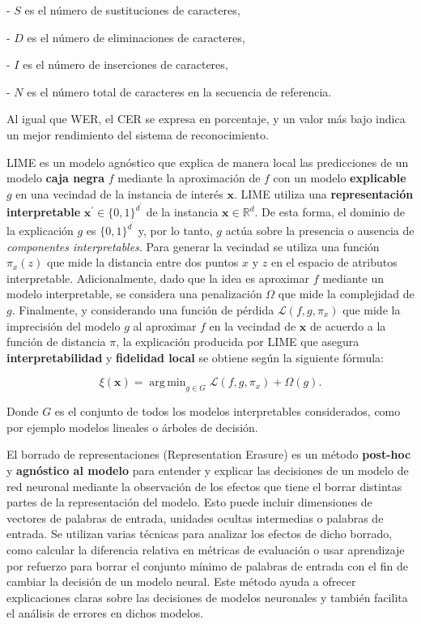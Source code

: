 \documentclass[conference]{IEEEtran}
\DeclareMathOperator*{\argmin}{arg\,min}
\begin{document}
\begin{itemize}
    - \( S \) es el número de sustituciones de caracteres,
    
    - \( D \) es el número de eliminaciones de caracteres,
    
    - \( I \) es el número de inserciones de caracteres,
    
    - \( N \) es el número total de caracteres en la secuencia de referencia.
    
    Al igual que WER, el CER se expresa en porcentaje, y un valor más bajo indica un mejor rendimiento del sistema de reconocimiento.
\end{itemize}

LIME \cite{ribeiro2016why} es un modelo agnóstico que explica de manera local las predicciones de un modelo \textbf{caja negra} $f$ mediante la aproximación de $f$ con un modelo \textbf{explicable} $g$ en una vecindad de la instancia de interés $\bm{x}$. LIME utiliza una \textbf{representación interpretable} $\bm{x^\prime} \in \{0,1\}^{d^\prime}$ de la instancia $\bm{x} \in \mathbb{R}^d$. De esta forma, el dominio de la explicación $g$ es $\{0,1\}^{d^\prime}$ y, por lo tanto, $g$ actúa sobre la presencia o ausencia de \textit{componentes interpretables}. Para generar la vecindad se utiliza una función $\pi_x(z)$ que mide la distancia entre dos puntos $x$ y $z$ en el espacio de atributos interpretable. Adicionalmente, dado que la idea es aproximar $f$ mediante un modelo interpretable, se considera una penalización $\Omega$ que mide la complejidad de $g$. Finalmente, y considerando una función de pérdida $\mathcal{L}(f, g, \pi_x)$ que mide la imprecisión del modelo $g$ al aproximar $f$ en la vecindad de $\bm{x}$ de acuerdo a la función de distancia $\pi$, la explicación producida por LIME que asegura \textbf{interpretabilidad} y \textbf{fidelidad local} se obtiene según la siguiente fórmula:

\begin{equation}
    \xi(\bm{x}) = \argmin_{g \in G} \mathcal{L}(f, g, \pi_x) + \Omega(g).
\end{equation}

Donde $G$ es el conjunto de todos los modelos interpretables considerados, como por ejemplo modelos lineales o árboles de decisión.

El borrado de representaciones \cite{li2017understanding} (Representation Erasure) es un método \textbf{post-hoc} y \textbf{agnóstico al modelo} para entender y explicar las decisiones de un modelo de red neuronal mediante la observación de los efectos que tiene el borrar distintas partes de la representación del modelo. Esto puede incluir dimensiones de vectores de palabras de entrada, unidades ocultas intermedias o palabras de entrada. Se utilizan varias técnicas para analizar los efectos de dicho borrado, como calcular la diferencia relativa en métricas de evaluación o usar aprendizaje por refuerzo para borrar el conjunto mínimo de palabras de entrada con el fin de cambiar la decisión de un modelo neural. Este método ayuda a ofrecer explicaciones claras sobre las decisiones de modelos neuronales y también facilita el análisis de errores en dichos modelos.
\end{document}
